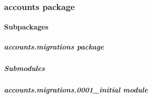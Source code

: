 \documentclass[letterpaper,10pt,english]{sphinxmanual}
\begin{document}
\subsubsection{accounts package}
\label{\detokenize{accounts:accounts-package}}\label{\detokenize{accounts::doc}}

\paragraph{Subpackages}
\label{\detokenize{accounts:subpackages}}
\sphinxstepscope


\subparagraph{accounts.migrations package}
\label{\detokenize{accounts.migrations:accounts-migrations-package}}\label{\detokenize{accounts.migrations::doc}}

\subparagraph{Submodules}
\label{\detokenize{accounts.migrations:submodules}}

\subparagraph{accounts.migrations.0001\_initial module}
\label{\detokenize{accounts.migrations:module-accounts.migrations.0001_initial}}\label{\detokenize{accounts.migrations:accounts-migrations-0001-initial-module}}
\end{document}
